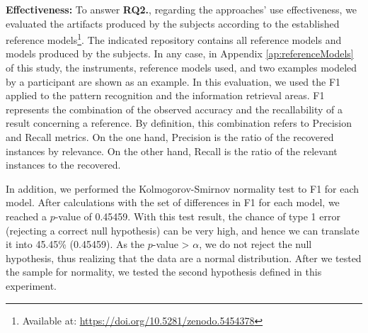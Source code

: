 %     

\textbf{Effectiveness:} 
To answer \textbf{RQ2.}, regarding the approaches' use effectiveness, we evaluated the artifacts produced by the subjects according to the established reference models\footnote{Available at: \url{https://doi.org/10.5281/zenodo.5454378}}.
The indicated repository contains all reference models and models produced by the subjects.
In any case, in Appendix \ref{ap:referenceModels} of this study, the instruments, reference models used, and two examples modeled by a participant are shown as an example.
In this evaluation, we used the F1 applied to the pattern recognition and the information retrieval areas.
F1 represents the combination of the observed accuracy and the recallability of a result concerning a reference.
By definition, this combination refers to Precision and Recall metrics. On the one hand, Precision is the ratio of the recovered instances by relevance. On the other hand, Recall is the ratio of the relevant instances to the recovered.

In addition, we performed the Kolmogorov-Smirnov normality test to F1 for each model. 
After calculations with the set of differences in F1 for each model, we reached a $p$-value of 0.45459.
With this test result, the chance of type 1 error (rejecting a correct null hypothesis) can be very high, and hence we can translate it into 45.45\% (0.45459).
As the $p$-value > $\alpha$, we do not reject the null hypothesis, thus realizing that the data are a normal distribution.
After we tested the sample for normality, we tested the second hypothesis defined in this experiment.

